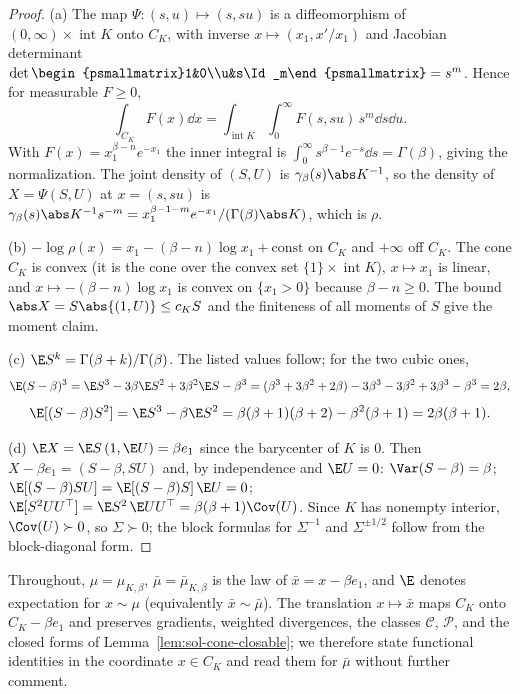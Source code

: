 \documentclass[../main.tex]{subfiles}
\begin{document}
\begin{proof}
(a) The map $\Psi:(s,u)\mapsto(s,su)$ is a diffeomorphism of $(0,\infty)\times\operatorname{int}K$
onto $C_K$, with inverse $x\mapsto(x_1,x'/x_1)$ and Jacobian determinant
$\det\begin{psmallmatrix}1&0\\u&s\Id_m\end{psmallmatrix}=s^m$.  Hence for measurable
$F\ge0$,
\[
  \int_{C_K}F(x)\dd x=\int_{\operatorname{int}K}\int_0^\infty F(s,su)\,s^m\dd s\dd u .
\]
With $F(x)=x_1^{\beta-n}e^{-x_1}$ the inner integral is $\int_0^\infty s^{\beta-1}e^{-s}\dd s
=\Gamma(\beta)$, giving the normalization.  The joint density of $(S,U)$ is
$\gamma_\beta(s)\abs K^{-1}$, so the density of $X=\Psi(S,U)$ at $x=(s,su)$ is
$\gamma_\beta(s)\abs K^{-1}s^{-m}=x_1^{\beta-1-m}e^{-x_1}/(\Gamma(\beta)\abs K)$, which is
$\rho$.

(b) $-\log\rho(x)=x_1-(\beta-n)\log x_1+\mathrm{const}$ on $C_K$ and $+\infty$ off $C_K$.
The cone $C_K$ is convex (it is the cone over the convex set $\{1\}\times\operatorname{int}K$),
$x\mapsto x_1$ is linear, and $x\mapsto-(\beta-n)\log x_1$ is convex on $\{x_1>0\}$ because
$\beta-n\ge0$.  The bound $\abs X=S\abs{(1,U)}\le c_KS$ and the finiteness of all moments of
$S$ give the moment claim.

(c) $\E S^k=\Gamma(\beta+k)/\Gamma(\beta)$.  The listed values follow; for the two cubic
ones,
\[
  \E(S-\beta)^3=\E S^3-3\beta\E S^2+3\beta^2\E S-\beta^3
  =(\beta^3+3\beta^2+2\beta)-3\beta^3-3\beta^2+3\beta^3-\beta^3=2\beta,
\]
\[
  \E[(S-\beta)S^2]=\E S^3-\beta\E S^2=\beta(\beta+1)(\beta+2)-\beta^2(\beta+1)=2\beta(\beta+1).
\]

(d) $\E X=\E S\,(1,\E U)=\beta e_1$ since the barycenter of $K$ is $0$.  Then
$X-\beta e_1=(S-\beta,SU)$ and, by independence and $\E U=0$:
$\Var(S-\beta)=\beta$; $\E[(S-\beta)SU]=\E[(S-\beta)S]\,\E U=0$;
$\E[S^2UU^\top]=\E S^2\,\E UU^\top=\beta(\beta+1)\Cov(U)$.  Since $K$ has nonempty interior,
$\Cov(U)\succ0$, so $\Sigma\succ0$; the block formulas for $\Sigma^{-1}$ and
$\Sigma^{\pm1/2}$ follow from the block-diagonal form.
\end{proof}

Throughout, $\mu=\mu_{K,\beta}$, $\bar\mu=\bar\mu_{K,\beta}$ is the law of $\bar x=x-\beta e_1$,
and $\E$ denotes expectation for $x\sim\mu$ (equivalently $\bar x\sim\bar\mu$).  The translation
$x\mapsto\bar x$ maps $C_K$ onto $C_K-\beta e_1$ and preserves gradients, weighted
divergences, the classes $\mathscr C$, $\mathscr P$, and the closed forms of
Lemma~\ref{lem:sol-cone-closable}; we therefore state functional identities in the coordinate
$x\in C_K$ and read them for $\bar\mu$ without further comment.
\end{document}
